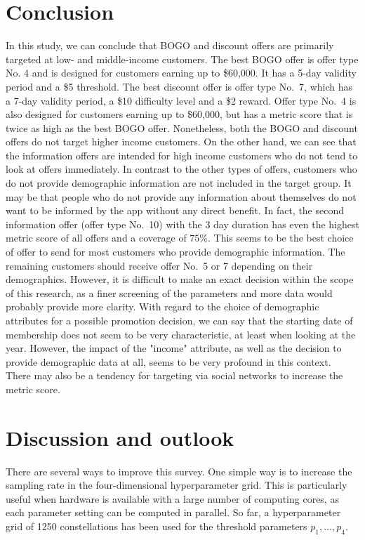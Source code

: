 \documentclass[11pt]{article} %
\begin{document}
\section{Conclusion}
In this study, we can conclude that BOGO and discount offers are primarily targeted at low- and middle-income customers. The best BOGO offer is offer type No. 4 and is designed for customers earning up to \$60,000.
It has a 5-day validity period and a \$5 threshold. 
The best discount offer is offer type No.~7, which has a 7-day validity period, a \$10 difficulty level and a \$2 reward.
Offer type No.~4 is also designed for customers earning up to \$60,000, but has a metric score that is twice as high as the best BOGO offer.
Nonetheless, both the BOGO and discount offers do not target higher income customers.
On the other hand, we can see that the information offers are intended for high income customers who do not tend to look at offers immediately.
In contrast to the other types of offers, customers who do not provide demographic information are not included in the target group.
It may be that people who do not provide any information about themselves do not want to be informed by the app without any direct benefit.
In fact, the second information offer (offer type No.~10) with the 3 day duration has even the highest metric score of all offers and a coverage of $75\%$.
This seems to be the best choice of offer to send for most customers who provide demographic information.
The remaining customers should receive offer No.~5 or 7 depending on their demographics.
However, it is difficult to make an exact decision within the scope of this research, as a finer screening of the parameters and more data would probably provide more clarity.
With regard to the choice of demographic attributes for a possible promotion decision, we can say that the starting date of membership does not seem to be very characteristic, at least when looking at the year.
However, the impact of the "income" attribute, as well as the decision to provide demographic data at all, seems to be very profound in this context.
There may also be a tendency for targeting via social networks to increase the metric score.

\section{Discussion and outlook}

There are several ways to improve this survey. 
One simple way is to increase the sampling rate in the four-dimensional hyperparameter grid.
This is particularly useful when hardware is available with a large number of computing cores, as each parameter setting can be computed in parallel. 
So far, a hyperparameter grid of 1250 constellations has been used for the threshold parameters $p_1,\dots, p_4$. 
\end{document}
